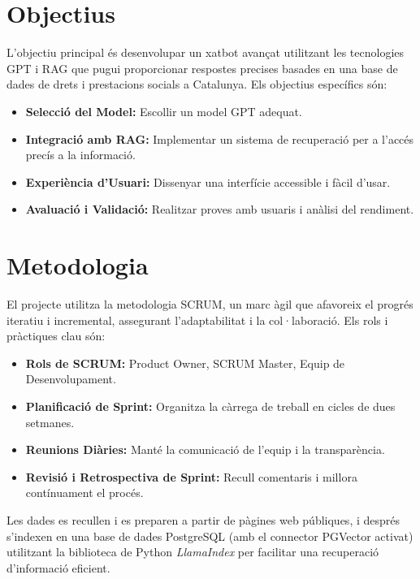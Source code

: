 \documentclass[a4paper,12pt,oneside]{ThesisStyle}
\begin{document}
\section{Objectius}
\label{sec:objectives}

L'objectiu principal és desenvolupar un xatbot avançat utilitzant les tecnologies GPT i RAG que pugui proporcionar respostes precises basades en una base de dades de drets i prestacions socials a Catalunya. Els objectius específics són:

\begin{itemize}
    \item \textbf{Selecció del Model:} Escollir un model GPT adequat.
    \item \textbf{Integració amb RAG:} Implementar un sistema de recuperació per a l'accés precís a la informació.
    \item \textbf{Experiència d'Usuari:} Dissenyar una interfície accessible i fàcil d'usar.
    \item \textbf{Avaluació i Validació:} Realitzar proves amb usuaris i anàlisi del rendiment.
\end{itemize}

\section{Metodologia}
\label{sec:methodology}

El projecte utilitza la metodologia SCRUM, un marc àgil que afavoreix el progrés iteratiu i incremental, assegurant l'adaptabilitat i la col·laboració. Els rols i pràctiques clau són:

\begin{itemize}
    \item \textbf{Rols de SCRUM:} Product Owner, SCRUM Master, Equip de Desenvolupament.
    \item \textbf{Planificació de Sprint:} Organitza la càrrega de treball en cicles de dues setmanes.
    \item \textbf{Reunions Diàries:} Manté la comunicació de l'equip i la transparència.
    \item \textbf{Revisió i Retrospectiva de Sprint:} Recull comentaris i millora contínuament el procés.
\end{itemize}

Les dades es recullen i es preparen a partir de pàgines web públiques, i després s'indexen en una base de dades PostgreSQL (amb el connector PGVector activat) utilitzant la biblioteca de Python \textit{LlamaIndex} per facilitar una recuperació d'informació eficient.
\end{document}

